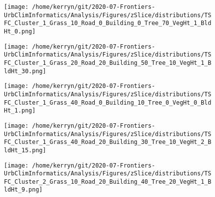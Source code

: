 \documentclass{article}
\begin{document}
\begin{figure}
\centering    
\texttt{[image: /home/kerryn/git/2020-07-Frontiers-UrbClimInformatics/Analysis/Figures/zSlice/distributions/TSFC\_Cluster\_1\_Grass\_10\_Road\_0\_Building\_0\_Tree\_70\_VegHt\_1\_BldHt\_0.png]}
\end{figure} 
\clearpage

\begin{figure}
\centering    
\texttt{[image: /home/kerryn/git/2020-07-Frontiers-UrbClimInformatics/Analysis/Figures/zSlice/distributions/TSFC\_Cluster\_1\_Grass\_20\_Road\_20\_Building\_50\_Tree\_10\_VegHt\_1\_BldHt\_30.png]}
\end{figure} 
\clearpage

\begin{figure}
\centering    
\texttt{[image: /home/kerryn/git/2020-07-Frontiers-UrbClimInformatics/Analysis/Figures/zSlice/distributions/TSFC\_Cluster\_1\_Grass\_40\_Road\_0\_Building\_10\_Tree\_0\_VegHt\_0\_BldHt\_1.png]}
\end{figure} 
\clearpage

\begin{figure}
\centering    
\texttt{[image: /home/kerryn/git/2020-07-Frontiers-UrbClimInformatics/Analysis/Figures/zSlice/distributions/TSFC\_Cluster\_1\_Grass\_40\_Road\_20\_Building\_30\_Tree\_10\_VegHt\_2\_BldHt\_15.png]}
\end{figure} 
\clearpage

\begin{figure}
\centering    
\texttt{[image: /home/kerryn/git/2020-07-Frontiers-UrbClimInformatics/Analysis/Figures/zSlice/distributions/TSFC\_Cluster\_2\_Grass\_10\_Road\_20\_Building\_40\_Tree\_20\_VegHt\_1\_BldHt\_9.png]}
\end{figure} 
\clearpage
\end{document}
